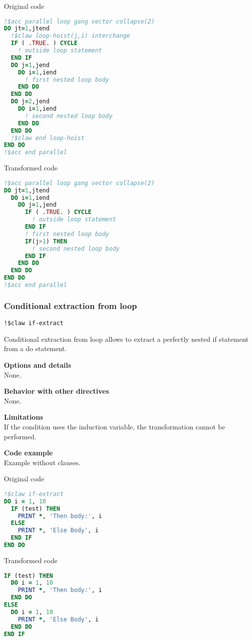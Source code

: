Original code
\begin{lstlisting}[language=Fortran]
!$acc parallel loop gang vector collapse(2)
DO jt=1,jtend
  !$claw loop-hoist(j,i) interchange
  IF ( .TRUE. ) CYCLE
    ! outside loop statement
  END IF
  DO j=1,jend
    DO i=1,iend
      ! first nested loop body
    END DO
  END DO
  DO j=2,jend
    DO i=1,iend
      ! second nested loop body
    END DO
  END DO
  !$claw end loop-hoist
END DO
!$acc end parallel
\end{lstlisting}


Transformed code
\begin{lstlisting}[language=Fortran]
!$acc parallel loop gang vector collapse(2)
DO jt=1,jtend
  DO i=1,iend
    DO j=1,jend
      IF ( .TRUE. ) CYCLE
        ! outside loop statement
      END IF
      ! first nested loop body
      IF(j>1) THEN
        ! second nested loop body
      END IF
    END DO
  END DO
END DO
!$acc end parallel
\end{lstlisting}


\subsubsection{Conditional extraction from loop}
\begin{lstlisting}
!$claw if-extract
\end{lstlisting}

Conditional extraction from loop allows to extract a perfectly nested if
statement from a do statement.

\textbf{Options and details}\\
None.

\textbf{Behavior with other directives}\\
None.

\textbf{Limitations}\\
If the condition uses the induction variable, the transformation cannot be
performed.

\textbf{Code example}\\
\label{if-extract-1}
Example without clauses.

Original code
\begin{lstlisting}[language=Fortran]
!$claw if-extract
DO i = 1, 10
  IF (test) THEN
    PRINT *, 'Then body:', i
  ELSE
    PRINT *, 'Else Body', i
  END IF
END DO
\end{lstlisting}

Transformed code
\begin{lstlisting}[language=Fortran]
IF (test) THEN
  DO i = 1, 10
    PRINT *, 'Then body:', i
  END DO
ELSE
  DO i = 1, 10
    PRINT *, 'Else Body', i
  END DO
END IF
\end{lstlisting}
